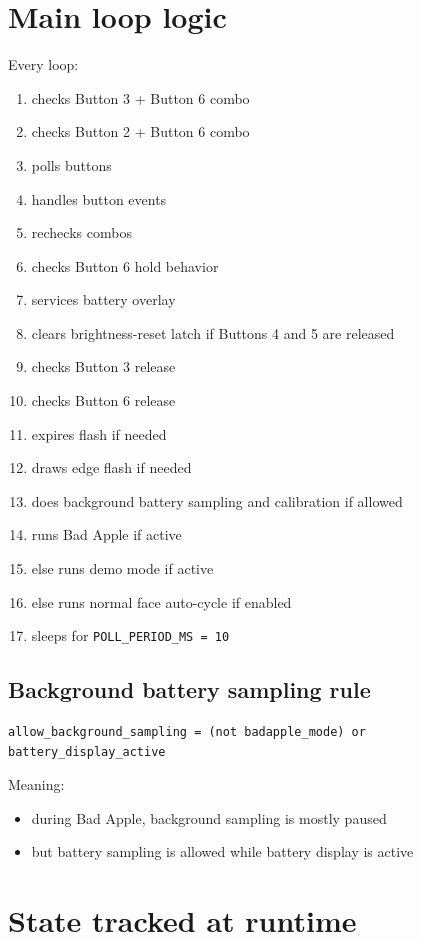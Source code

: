 \documentclass[11pt]{article}
\begin{document}
\section{Main loop logic}
Every loop:
\begin{enumerate}
  \item checks Button 3 + Button 6 combo
  \item checks Button 2 + Button 6 combo
  \item polls buttons
  \item handles button events
  \item rechecks combos
  \item checks Button 6 hold behavior
  \item services battery overlay
  \item clears brightness-reset latch if Buttons 4 and 5 are released
  \item checks Button 3 release
  \item checks Button 6 release
  \item expires flash if needed
  \item draws edge flash if needed
  \item does background battery sampling and calibration if allowed
  \item runs Bad Apple if active
  \item else runs demo mode if active
  \item else runs normal face auto-cycle if enabled
  \item sleeps for \texttt{POLL\_PERIOD\_MS = 10}
\end{enumerate}

\subsection{Background battery sampling rule}
\begin{lstlisting}
allow_background_sampling = (not badapple_mode) or battery_display_active
\end{lstlisting}

Meaning:
\begin{itemize}
  \item during Bad Apple, background sampling is mostly paused
  \item but battery sampling is allowed while battery display is active
\end{itemize}

\section{State tracked at runtime}
\end{document}
